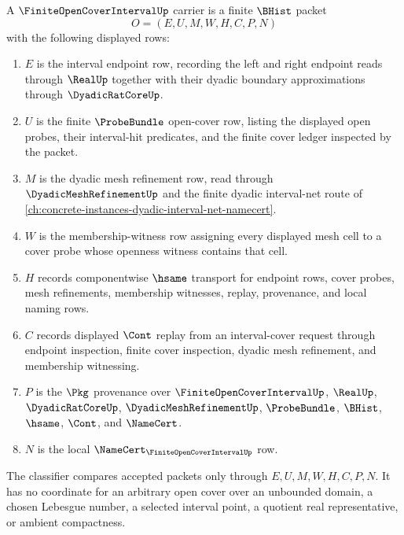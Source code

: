 \begin{definition}
\label{def:finite-open-cover-interval-carrier}
A $\FiniteOpenCoverIntervalUp$ carrier is a finite $\BHist$ packet
$$
O=(E,U,M,W,H,C,P,N)
$$
with the following displayed rows:
\begin{enumerate}
\item $E$ is the interval endpoint row, recording the left and right endpoint reads through $\RealUp$ together with their dyadic boundary approximations through $\DyadicRatCoreUp$.
\item $U$ is the finite $\ProbeBundle$ open-cover row, listing the displayed open probes, their interval-hit predicates, and the finite cover ledger inspected by the packet.
\item $M$ is the dyadic mesh refinement row, read through $\DyadicMeshRefinementUp$ and the finite dyadic interval-net route of \autoref{ch:concrete-instances-dyadic-interval-net-namecert}.
\item $W$ is the membership-witness row assigning every displayed mesh cell to a cover probe whose openness witness contains that cell.
\item $H$ records componentwise $\hsame$ transport for endpoint rows, cover probes, mesh refinements, membership witnesses, replay, provenance, and local naming rows.
\item $C$ records displayed $\Cont$ replay from an interval-cover request through endpoint inspection, finite cover inspection, dyadic mesh refinement, and membership witnessing.
\item $P$ is the $\Pkg$ provenance over $\FiniteOpenCoverIntervalUp$, $\RealUp$, $\DyadicRatCoreUp$, $\DyadicMeshRefinementUp$, $\ProbeBundle$, $\BHist$, $\hsame$, $\Cont$, and $\NameCert$.
\item $N$ is the local $\NameCert_{\FiniteOpenCoverIntervalUp}$ row.
\end{enumerate}
The classifier compares accepted packets only through $E,U,M,W,H,C,P,N$. It has no coordinate for an arbitrary open cover over an unbounded domain, a chosen Lebesgue number, a selected interval point, a quotient real representative, or ambient compactness.
\end{definition}

